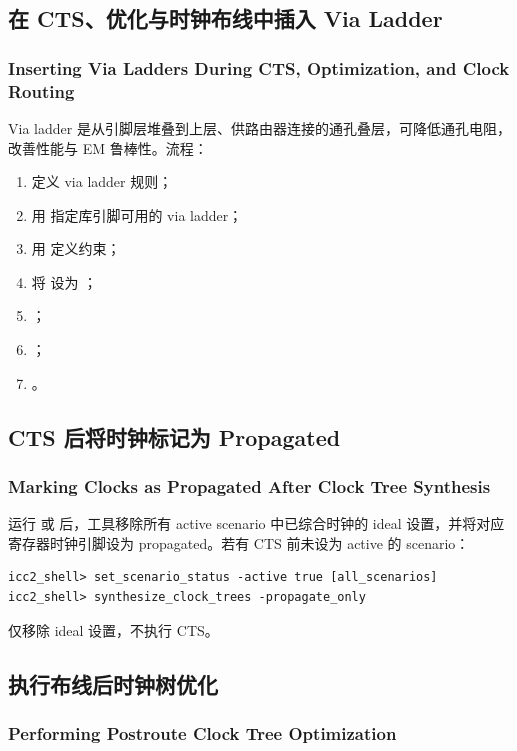 \subsection{在 CTS、优化与时钟布线中插入 Via Ladder}
\subsubsection*{Inserting Via Ladders During CTS, Optimization, and Clock Routing}

Via ladder 是从引脚层堆叠到上层、供路由器连接的通孔叠层，可降低通孔电阻，改善性能与 EM 鲁棒性。流程：
\begin{enumerate}
  \item 定义 via ladder 规则；
  \item 用  指定库引脚可用的 via ladder；
  \item 用  定义约束；
  \item 将  设为 ；
  \item {}；
  \item {}；
  \item {}。
\end{enumerate}

\subsection{CTS 后将时钟标记为 Propagated}
\subsubsection*{Marking Clocks as Propagated After Clock Tree Synthesis}

运行  或  后，工具移除所有 active scenario 中已综合时钟的 ideal 设置，并将对应寄存器时钟引脚设为 propagated。若有 CTS 前未设为 active 的 scenario：
\begin{lstlisting}
icc2_shell> set_scenario_status -active true [all_scenarios]
icc2_shell> synthesize_clock_trees -propagate_only
\end{lstlisting}
 仅移除 ideal 设置，不执行 CTS。

\subsection{执行布线后时钟树优化}
\subsubsection*{Performing Postroute Clock Tree Optimization}

